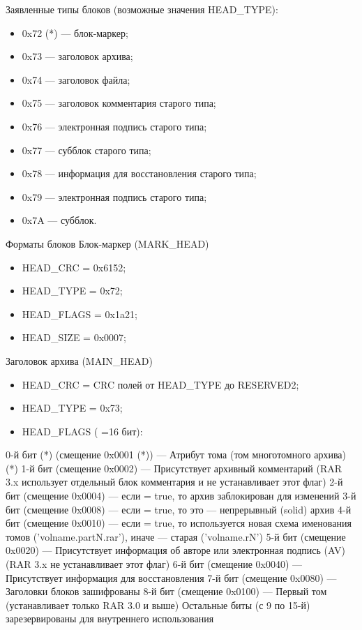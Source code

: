 Заявленные типы блоков (возможные значения HEAD_TYPE):             
\begin{itemize}
\item 0x72 (*) — блок-маркер;
\item 0x73 — заголовок архива;
\item 0x74 — заголовок файла;
\item 0x75 — заголовок комментария старого типа;
\item 0x76 — электронная подпись старого типа;
\item 0x77 — субблок старого типа;
\item 0x78 — информация для восстановления старого типа;
\item 0x79 — электронная подпись старого типа;
\item 0x7A — субблок.
\end{itemize}

Форматы блоков
Блок-маркер (MARK_HEAD)
\begin{itemize}
\item HEAD_CRC = 0x6152;
\item HEAD_TYPE = 0x72;
\item HEAD_FLAGS = 0x1a21;
\item HEAD_SIZE = 0x0007;
\end{itemize}

Заголовок архива (MAIN_HEAD)
\begin{itemize}
\item HEAD_CRC = CRC полей от HEAD_TYPE до RESERVED2;
\item HEAD_TYPE = 0x73;
\item HEAD_FLAGS ( =16 бит):                     
\end{itemize}

0-й бит (*) (смещение 0x0001 (*)) — Атрибут тома (том многотомного архива) (*)
1-й бит (смещение 0x0002) — Присутствует архивный комментарий (RAR 3.x использует отдельный блок комментария и не устанавливает этот флаг)
2-й бит (смещение 0x0004) — если = true, то архив заблокирован для изменений
3-й бит (смещение 0x0008) — если = true, то это — непрерывный (solid) архив
4-й бит (смещение 0x0010) — если = true, то используется новая схема именования томов ('volname.partN.rar'), иначе — старая ('volname.rN')
5-й бит (смещение 0x0020) — Присутствует информация об авторе или электронная подпись (AV) (RAR 3.x не устанавливает этот флаг)
6-й бит (смещение 0x0040) — Присутствует информация для восстановления
7-й бит (смещение 0x0080) — Заголовки блоков зашифрованы
8-й бит (смещение 0x0100) — Первый том (устанавливает только RAR 3.0 и выше)
Остальные биты (с 9 по 15-й) зарезервированы для внутреннего использования

